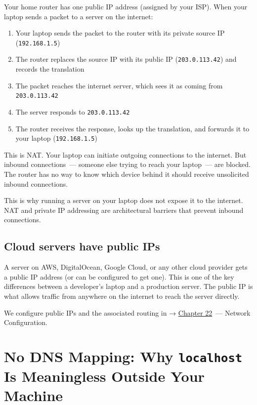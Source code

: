 Your home router has one public IP address (assigned by your ISP). When your laptop sends a packet to a server on the internet:

\begin{enumerate}
\def\labelenumi{\arabic{enumi}.}
\tightlist
\item
  Your laptop sends the packet to the router with its private source IP (\texttt{192.168.1.5})
\item
  The router replaces the source IP with its public IP (\texttt{203.0.113.42}) and records the translation
\item
  The packet reaches the internet server, which sees it as coming from \texttt{203.0.113.42}
\item
  The server responds to \texttt{203.0.113.42}
\item
  The router receives the response, looks up the translation, and forwards it to your laptop (\texttt{192.168.1.5})
\end{enumerate}

\noindent{}This is NAT. Your laptop can initiate outgoing connections to the internet. But inbound connections~--- someone else trying to reach your laptop~--- are blocked. The router has no way to know which device behind it should receive unsolicited inbound connections.

This is why running a server on your laptop does not expose it to the internet. NAT and private IP addressing are architectural barriers that prevent inbound connections.

\subsection*{Cloud servers have public IPs}\label{10-networking-limitations:cloud-servers-have-public-ips}

A server on AWS, DigitalOcean, Google Cloud, or any other cloud provider gets a public IP address (or can be configured to get one). This is one of the key differences between a developer's laptop and a production server. The public IP is what allows traffic from anywhere on the internet to reach the server directly.

We configure public IPs and the associated routing in → \hyperref[ch:22-network-configuration]{Chapter 22}~--- Network Configuration.

\setcounter{section}{2}
\section{\texorpdfstring{No DNS Mapping: Why \texttt{localhost} Is Meaningless Outside Your
Machine}{No DNS Mapping: Why localhost Is Meaningless Outside Your Machine}}\label{10-networking-limitations:103-no-dns-mapping-why-localhost-is-meaningless-outside-your-machine}

